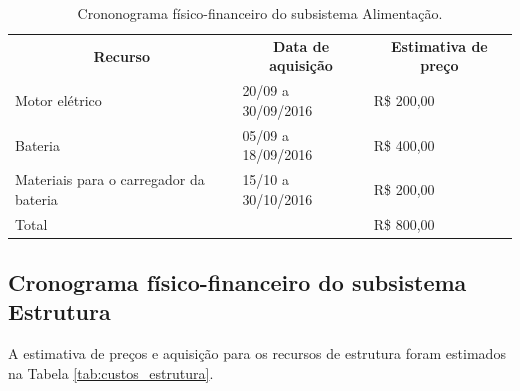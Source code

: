 \begin{table}[h]
 \centering
 {\renewcommand\arraystretch{1.25}
 \caption{Crononograma físico-financeiro do subsistema Alimentação.}
 \label{tab:custo_alimentacao}
 \begin{tabular}{ l l l }
  \cline{1-1}\cline{2-2}\cline{3-3}  
    \multicolumn{1}{|c|}{\textbf{Recurso} \centering } &
    \multicolumn{1}{c|}{\textbf{Data de aquisição} \centering } &
    \multicolumn{1}{c|}{\textbf{Estimativa de preço} \centering }
  \\  
  \cline{1-1}\cline{2-2}\cline{3-3}  
    \multicolumn{1}{|p{3.850cm}|}{Motor elétrico \centering } &
    \multicolumn{1}{p{4.217cm}|}{20/09 a 30/09/2016 \centering } &
    \multicolumn{1}{p{4.217cm}|}{R\$ 200,00 \centering }
  \\  
  \cline{1-1}\cline{2-2}\cline{3-3}  
    \multicolumn{1}{|p{3.850cm}|}{Bateria \centering } &
    \multicolumn{1}{p{4.217cm}|}{05/09 a 18/09/2016 \centering } &
    \multicolumn{1}{p{4.217cm}|}{R\$ 400,00 \centering }
  \\  
  \cline{1-1}\cline{2-2}\cline{3-3}  
    \multicolumn{1}{|p{3.850cm}|}{Materiais para o carregador da bateria \centering } &
    \multicolumn{1}{p{4.217cm}|}{15/10 a 30/10/2016 \centering } &
    \multicolumn{1}{p{4.217cm}|}{R\$ 200,00 \centering }
  \\  
  \cline{1-1}\cline{2-2}\cline{3-3}  
    \multicolumn{2}{|p{3.850cm}|}{Total \centering } &
    \multicolumn{1}{p{4.217cm}|}{R\$ 800,00 \centering }
  \\  
  \hline

 \end{tabular} }
\end{table}




\subsection{Cronograma físico-financeiro do subsistema Estrutura}

A estimativa de preços e aquisição para os recursos de estrutura foram estimados na Tabela \ref{tab:custos_estrutura}.

